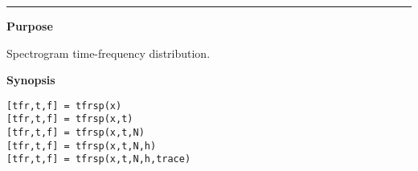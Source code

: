 

\hspace*{-1.6cm}{\Large \bf tfrsp}

\vspace*{-.4cm}
\hspace*{-1.6cm}\rule[0in]{16.5cm}{.02cm}
\vspace*{.2cm}

{\bf \large {}\selectfont Purpose}\\
\hspace*{1.5cm}
\begin{minipage}[t]{13.5cm}
Spectrogram time-frequency distribution.
\end{minipage}
\vspace*{.5cm}

{\bf \large {}\selectfont Synopsis}\\
\hspace*{1.5cm}
\begin{minipage}[t]{13.5cm}
\begin{verbatim}
[tfr,t,f] = tfrsp(x)
[tfr,t,f] = tfrsp(x,t)
[tfr,t,f] = tfrsp(x,t,N)
[tfr,t,f] = tfrsp(x,t,N,h)
[tfr,t,f] = tfrsp(x,t,N,h,trace)
\end{verbatim}
\end{minipage}
\vspace*{.5cm}

